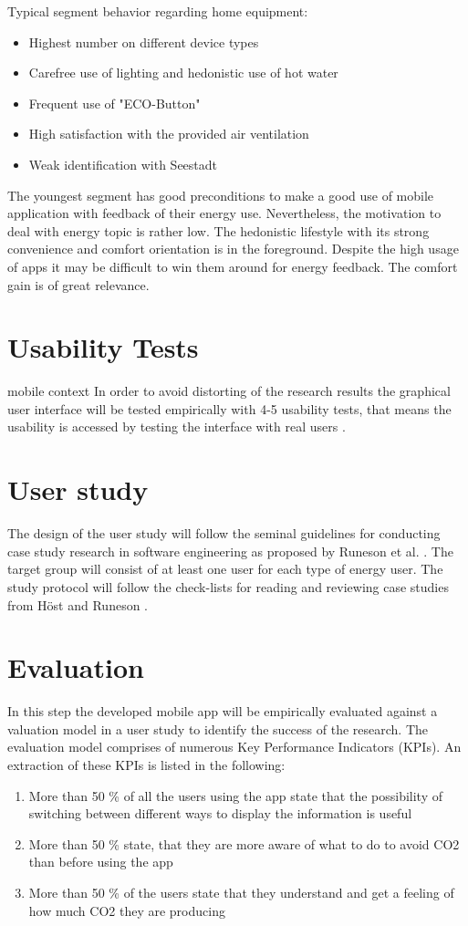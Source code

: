 Typical segment behavior regarding home equipment:
\begin{itemize}
	\item Highest number on different device types
	\item Carefree use of lighting and hedonistic use of hot water
	\item Frequent use of "ECO-Button"
	\item High satisfaction with the provided air ventilation
	\item Weak identification with Seestadt
\end{itemize}

The youngest segment has good preconditions to make a good use of mobile application with feedback of their energy use. Nevertheless, the motivation to deal with energy topic is rather low. The hedonistic lifestyle with its strong convenience and comfort orientation is in the foreground. Despite the high usage of apps it may be difficult to win them around for energy feedback. The comfort gain is of great relevance.

\section{Usability Tests} mobile context
In order to avoid distorting of the research results the graphical user interface will be tested empirically with 4-5 usability tests, that means the usability is accessed by testing the interface with real users \cite{nielsen1994usability}.

\section{User study}
The design of the user study will follow the seminal guidelines for conducting case study research in software engineering as proposed by Runeson et al. \cite{runeson2012case}. The target group will consist of at least one user for each type of energy user. The study protocol will follow the check-lists for reading and reviewing case studies from H\"ost and Runeson \cite{host2007checklists}.

\section{Evaluation}
In this step the developed mobile app will be empirically evaluated against a valuation model in a user study to identify the success of the research. The evaluation model comprises of numerous Key Performance Indicators (KPIs). An extraction of these KPIs is listed in the following:
\begin{enumerate}
	\item More than 50 \% of all the users using the app state that the possibility of switching between different ways to display the information is useful
	\item More than 50 \% state, that they are more aware of what to do to avoid CO2 than before using the app
	\item More than 50 \% of the users state that they understand and get a feeling of how much CO2 they are producing
\end{enumerate}


